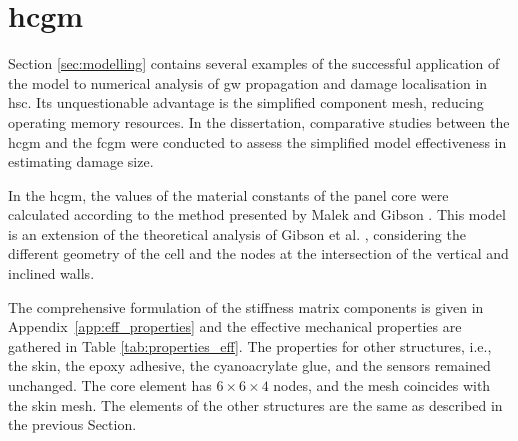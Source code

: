 \section{\Acl{hcgm}}
\label{sec:homogenised}

Section \ref{sec:modelling} contains several examples of the successful application of the model to numerical analysis of \ac{gw} propagation and damage localisation in \ac{hsc}.
Its unquestionable advantage is the simplified component mesh, reducing operating memory resources.
In the dissertation, comparative studies between the \ac{hcgm} and the \ac{fcgm} were conducted to assess the simplified model effectiveness in estimating damage size.

In the \ac{hcgm}, the values of the material constants of the panel core were calculated according to the method presented by Malek and Gibson \cite{malek2015effective}.
This model is an extension of the theoretical analysis of Gibson et al. \cite{gibson1982mechanics}, considering the different geometry of the cell and the nodes at the intersection of the vertical and inclined walls.

The comprehensive formulation of the stiffness matrix components is given in Appendix~\ref{app:eff_properties} and the effective mechanical properties are gathered in Table \ref{tab:properties_eff}.
The properties for other structures, i.e., the skin, the epoxy adhesive, the cyanoacrylate glue, and the sensors remained unchanged.
The core element has \(6 \times 6 \times 4\) nodes, and the mesh coincides with the skin mesh.
The elements of the other structures are the same as described in the previous Section.